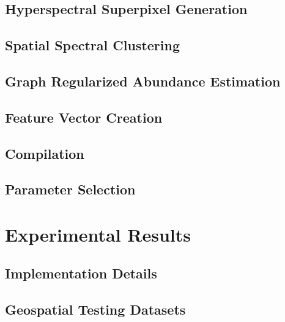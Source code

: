 \documentclass[10pt]{article}
\begin{document}
\clearpage
% 
\subsection{Hyperspectral Superpixel Generation} \label{Algorithm Superpixels}



\clearpage
\subsection{Spatial Spectral Clustering}\label{Algorithm Laplacian}

\subsection{Graph Regularized Abundance Estimation}\label{Algorithm Unmixing}
% 
\subsection{Feature Vector Creation}\label{Algorithm FV}

\subsection{Compilation}\label{Compilation}

\subsection{Parameter Selection}\label{Parameters}


\clearpage
% 
% 
% 
% 
% 
\section{Experimental Results}


\subsection{Implementation Details}

\clearpage
\subsection{Geospatial Testing Datasets}
\end{document}
